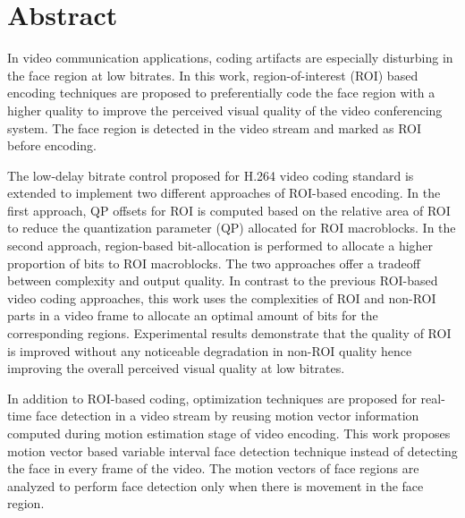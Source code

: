 
\thispagestyle{plain}

\section*{Abstract}
In video communication applications, coding artifacts are especially disturbing in the face region at low bitrates. In this work, region-of-interest (ROI) based encoding techniques are proposed to preferentially code the face region with a higher quality to improve the perceived visual quality of the video conferencing system. The face region is detected in the video stream and marked as ROI before encoding. 

The low-delay bitrate control proposed for H.264 video coding standard is extended to implement two different approaches of ROI-based encoding. In the first approach, QP offsets for ROI is computed based on the relative area of ROI to reduce the quantization parameter (QP) allocated for ROI macroblocks. In the second approach, region-based bit-allocation is performed to allocate a higher proportion of bits to ROI macroblocks. The two approaches offer a tradeoff between complexity and output quality. In contrast to the previous ROI-based video coding approaches, this work uses the complexities of ROI and non-ROI parts in a video frame to allocate an optimal amount of bits for the corresponding regions. Experimental results demonstrate that the quality of ROI is improved without any noticeable degradation in non-ROI quality hence improving the overall perceived visual quality at low bitrates.

In addition to ROI-based coding, optimization techniques are proposed for real-time face detection in a video stream by reusing motion vector information computed during motion estimation stage of video encoding. This work proposes motion vector based variable interval face detection technique instead of detecting the face in every frame of the video. The motion vectors of face regions are analyzed to perform face detection only when there is movement in the face region.

